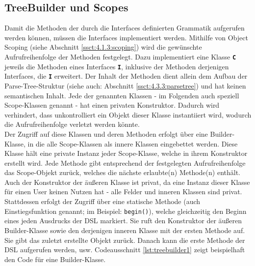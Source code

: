 \subsection{TreeBuilder und Scopes}\label{ssct:4.3.2:treebuilder}
Damit die Methoden der durch die Interfaces definierten Grammatik aufgerufen werden können, müssen die Interfaces implementiert werden. Mithilfe von Object Scoping (siehe Abschnitt \ref{ssct:4.1.3:scoping}) wird die gewünschte Aufrufreihenfolge der Methoden festgelegt. Dazu implementiert eine Klasse \textbf{\texttt{C}} jeweils die Methoden eines Interfaces \textbf{\texttt{I}}, inklusive der Methoden derjenigen Interfaces, die \textbf{\texttt{I}} erweitert. Der Inhalt der Methoden dient allein dem Aufbau der Parse-Tree-Struktur (siehe auch: Abschnitt \ref{ssct:4.3.3:parsetree}) und hat keinen semantischen Inhalt. Jede der genannten Klassen - im Folgenden auch speziell Scope-Klassen genannt - hat einen privaten Konstruktor. Dadurch wird verhindert, dass unkontrolliert ein Objekt dieser Klasse instantiiert wird, wodurch die Aufrufreihenfolge verletzt werden könnte.\\
Der Zugriff auf diese Klassen und deren Methoden erfolgt über eine Builder-Klasse, in die alle Scope-Klassen als innere Klassen eingebettet werden. Diese Klasse hält eine private Instanz jeder Scope-Klasse, welche in ihrem Konstruktor erstellt wird. Jede Methode gibt entsprechend der festgelegten Aufrufreihenfolge das Scope-Objekt zurück, welches die nächste erlaubte(n) Methode(n) enthält. Auch der Konstruktor der äußeren Klasse ist privat, da eine Instanz dieser Klasse für einen User keinen Nutzen hat - alle Felder und inneren Klassen sind privat.  Stattdessen erfolgt der Zugriff über eine statische Methode (auch Einstiegsfunktion genannt; im Beispiel: \texttt{begin()}), welche gleichzeitig den Beginn eines jeden Ausdrucks der DSL markiert. Sie ruft den Konstruktor der äußeren Builder-Klasse sowie den derjenigen inneren Klasse mit der ersten Methode auf. Sie gibt das zuletzt erstellte Objekt zurück. Danach kann die erste Methode der DSL aufgerufen werden, usw. Codeausschnitt \ref{lst:treebuilder1} zeigt beispielhaft den Code für eine Builder-Klasse.

